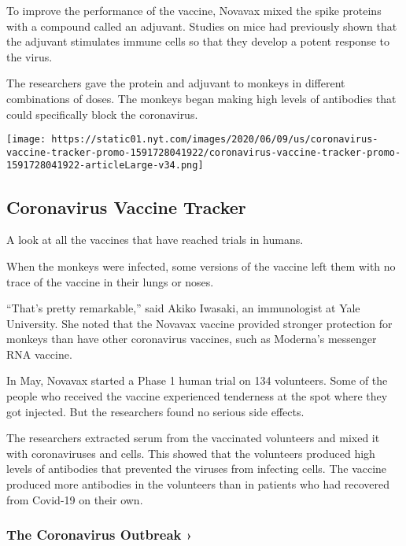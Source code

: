 To improve the performance of the vaccine, Novavax mixed the spike
proteins with a compound called an adjuvant. Studies on mice had
previously shown that the adjuvant stimulates immune cells so that they
develop a potent response to the virus.

The researchers gave the protein and adjuvant to monkeys in different
combinations of doses. The monkeys began making high levels of
antibodies that could specifically block the coronavirus.

\href{https://www.nytimes.com/interactive/2020/science/coronavirus-vaccine-tracker.html}{}

\texttt{[image: https://static01.nyt.com/images/2020/06/09/us/coronavirus-vaccine-tracker-promo-1591728041922/coronavirus-vaccine-tracker-promo-1591728041922-articleLarge-v34.png]}

\hypertarget{coronavirus-vaccine-tracker}{%
\subsection{Coronavirus Vaccine
Tracker}\label{coronavirus-vaccine-tracker}}

A look at all the vaccines that have reached trials in humans.

When the monkeys were infected, some versions of the vaccine left them
with no trace of the vaccine in their lungs or noses.

``That's pretty remarkable,'' said Akiko Iwasaki, an immunologist at
Yale University. She noted that the Novavax vaccine provided stronger
protection for monkeys than have other coronavirus vaccines, such as
Moderna's messenger RNA vaccine.

In May, Novavax started a Phase 1 human trial on 134 volunteers. Some of
the people who received the vaccine experienced tenderness at the spot
where they got injected. But the researchers found no serious side
effects.

The researchers extracted serum from the vaccinated volunteers and mixed
it with coronaviruses and cells. This showed that the volunteers
produced high levels of antibodies that prevented the viruses from
infecting cells. The vaccine produced more antibodies in the volunteers
than in patients who had recovered from Covid-19 on their own.

\href{https://www.nytimes.com/news-event/coronavirus?action=click\&pgtype=Article\&state=default\&region=MAIN_CONTENT_3\&context=storylines_faq}{}

\hypertarget{the-coronavirus-outbreak-}{%
\subsubsection{The Coronavirus Outbreak
›}\label{the-coronavirus-outbreak-}}

